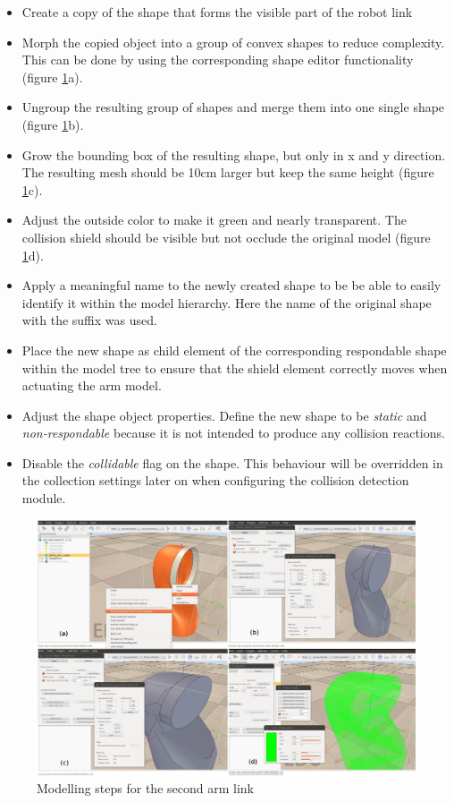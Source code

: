 \begin{itemize}
\item
Create a copy of the shape that forms the visible part of the robot link
\item
Morph the copied object into a group of convex shapes to reduce complexity. This can be done by using the corresponding shape editor functionality (figure \ref{fig:shield_steps}a).
\item
Ungroup the resulting group of shapes and merge them into one single shape (figure \ref{fig:shield_steps}b).
\item
Grow the bounding box of the resulting shape, but only in x and y direction. The resulting mesh should be 10cm larger but keep the same height (figure \ref{fig:shield_steps}c).
\item
Adjust the outside color to make it green and nearly transparent. The collision shield should be visible but not occlude the original model (figure \ref{fig:shield_steps}d).
\item
Apply a meaningful name to the newly created shape to be be able to easily identify it within the model hierarchy. Here the name of the original shape with the  suffix was used.
\item
Place the new shape as child element of the corresponding respondable shape within the model tree to ensure that the shield element correctly moves when actuating the arm model.
\item
Adjust the shape object properties. Define the new shape to be \emph{static} and \emph{non-respondable} because it is not intended to produce any collision reactions.
\item
Disable the \emph{collidable} flag on the shape. This behaviour will be overridden in the collection
settings later on when configuring the collision detection module.
\end{itemize}

\begin{figure}[h]
	\centering
  	\includegraphics[width=1.0\textwidth]{images/shield_steps.jpg}
	\caption{Modelling steps for the second arm link}
	\label{fig:shield_steps}
\end{figure}

